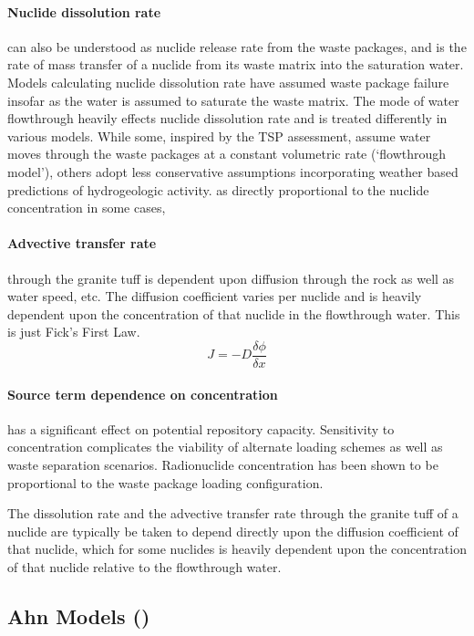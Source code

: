 \paragraph{Nuclide dissolution rate} can also be understood as nuclide release rate from the waste 
packages, and is the rate of mass transfer of a nuclide from its waste matrix into the saturation 
water. Models calculating  nuclide dissolution rate have assumed waste package failure insofar as 
the water is assumed to saturate the waste matrix. The mode of water flowthrough heavily effects 
nuclide dissolution rate and is treated differently in various models. While some, inspired by the 
TSP assessment, assume water moves through the waste packages at a constant volumetric rate 
(`flowthrough model'), others adopt less conservative assumptions incorporating weather based 
predictions of hydrogeologic activity. as directly proportional to the nuclide concentration in some 
cases,  \paragraph{Advective transfer rate} through the granite tuff is dependent upon diffusion 
through the rock as well as water speed, etc. The diffusion coefficient varies per nuclide and is 
heavily dependent upon the concentration of that nuclide in the flowthrough water. This is just 
Fick's First Law.  \begin{equation}
J = -D\frac{\delta\phi}{\delta x}
\end{equation}
\paragraph{Source term dependence on concentration} has a significant effect on potential repository 
capacity. Sensitivity to concentration complicates the viability of alternate loading schemes as 
well as waste separation scenarios. Radionuclide concentration has been shown to be proportional to 
the waste package loading configuration.\cite{ahn_relationship_2002,kawasaki_congruent_2004}

The dissolution rate and the advective transfer rate through the granite tuff of a nuclide are 
typically be taken to depend directly upon the diffusion coefficient of that nuclide, which for some 
nuclides is heavily dependent upon the concentration of that nuclide relative to the flowthrough 
water. 

\subsection{Ahn Models (\cite{ahn_environmental_2004, ahn_environmental_2007})}
